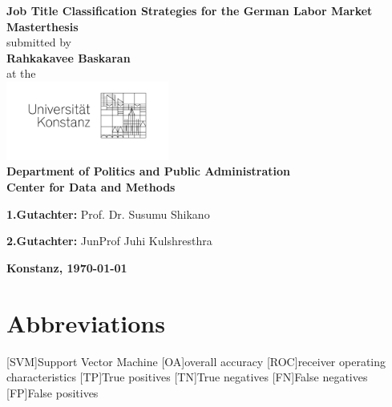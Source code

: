 \documentclass[12pt, a4paper, titlepage]{article}
\begin{document}
\begin{titlepage}
    \begin{center}
    {\LARGE \textbf{Job Title Classification Strategies for the German Labor Market}}
    \\[1cm]
    {\Large \textbf{Masterthesis}}
    \\[1cm]
    {\Large submitted by}
    \\[0.5cm]
    {\LARGE \textbf{Rahkakavee Baskaran}}
    \\[0.5cm]
    {\Large at the}
    \\[0.5cm]
    \includegraphics[width=0.4\textwidth]{logo.jpg}
    \\[1cm]
    {\Large \textbf{Department of Politics and Public Administration}}
    \\[1cm]
    {\Large \textbf{Center for Data and Methods}}
    \\[2cm]
    \begin{minipage}[c]{0.8\textwidth}
    \begin{description}
     \item {\Large \textbf{1.Gutachter:} Prof. Dr. Susumu Shikano}
     \item {\Large \textbf{2.Gutachter:} JunProf Juhi Kulshresthra}
    \end{description}
    \end{minipage}
    \vfill
    {\LARGE \textbf{Konstanz, \today}}
    \end{center}
    \end{titlepage}

\tableofcontents
\newpage


\section*{Abbreviations}
\begin{acronym}
  [SVM]{Support Vector Machine}
  [OA]{overall accuracy}
  [ROC]{receiver operating characteristics}
  [TP]{True positives}
  [TN]{True negatives}
  [FN]{False negatives}
  [FP]{False positives}
\end{acronym}
\newpage
\end{document}

